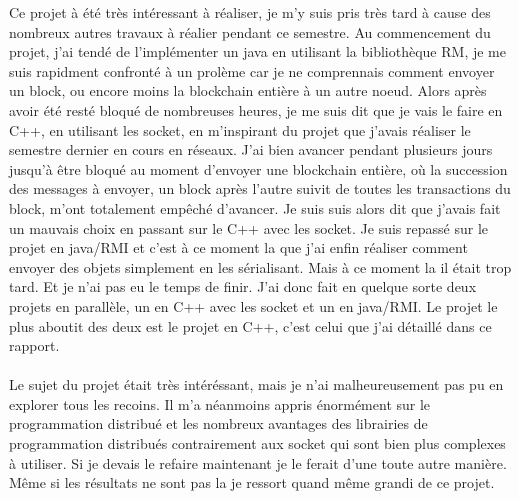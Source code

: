 \documentclass[a4paper,11pt,DIV=12]{scrreprt}
\begin{document}
    Ce projet à été très intéressant à réaliser, je m'y suis pris très tard à
    cause des nombreux autres travaux à réalier pendant ce semestre.
    Au commencement du projet, j'ai tendé de l'implémenter un java en utilisant
    la bibliothèque RM, je me suis rapidment confronté à un prolème car je ne
    comprennais comment envoyer un block, ou encore moins la blockchain entière
    à un autre noeud. Alors après avoir été resté bloqué de nombreuses heures,
    je me suis dit que je vais le faire en C++, en utilisant les socket, en
    m'inspirant du projet que j'avais réaliser le semestre dernier en cours en
    réseaux. J'ai bien avancer pendant plusieurs jours jusqu'à être bloqué au
    moment d'envoyer une blockchain entière, où la succession des messages à
    envoyer, un block après l'autre suivit de toutes les transactions du block,
    m'ont totalement empêché d'avancer. Je suis suis alors dit que j'avais fait
    un mauvais choix en passant sur le C++ avec les socket. Je suis repassé sur
    le projet en java/RMI et c'est à ce moment la que j'ai enfin réaliser
    comment envoyer des objets simplement en les sérialisant. Mais à ce moment
    la il était trop tard. Et je n'ai pas eu le temps de finir.
    J'ai donc fait en quelque sorte deux projets en parallèle, un en C++ avec
    les socket et un en java/RMI. Le projet le plus aboutit des deux est le
    projet en C++, c'est celui que j'ai détaillé dans ce rapport.\\
    \\
    
    Le sujet du projet était très intéréssant, mais je n'ai malheureusement pas
    pu en explorer tous les recoins. Il m'a néanmoins appris énormément sur le
    programmation distribué et les nombreux avantages des librairies de
    programmation distribués contrairement aux socket qui sont bien plus
    complexes à utiliser. Si je devais le refaire maintenant je le ferait d'une
    toute autre manière. Même si les résultats ne sont pas la je ressort quand
    même grandi de ce projet.
    
    

\end{document}
